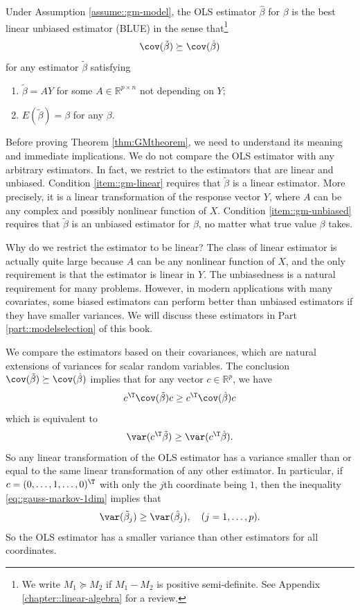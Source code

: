 \begin{theorem}
\label{thm:GMtheorem}Under Assumption \ref{assume::gm-model}, the OLS estimator
$\hat{\beta}$ for $\beta$ is the best linear unbiased estimator
(BLUE) in the sense that\footnote{We write $M_1 \succeq   M_2$  if $M_1 - M_2$ is positive semi-definite. See Appendix \ref{chapter::linear-algebra} for a review.} 
$$
\cov(\tilde{\beta})  \succeq 
\cov(\hat{\beta})
$$
for any estimator $\tilde{\beta}$ satisfying 
\begin{enumerate}[label=(\textup{C}\arabic*), ref=\textup{C}\arabic*]
\item\label{item::gm-linear} $\tilde{\beta}=AY$ for some $A\in\mathbb{R}^{p\times n}$ not depending
on $Y$;
\item\label{item::gm-unbiased} $ E (\tilde{\beta} ) = \beta$   for any
$\beta$.
\end{enumerate}
\end{theorem}

Before proving Theorem \ref{thm:GMtheorem}, we need to understand its meaning and immediate implications. We do not compare the OLS estimator with any arbitrary estimators. In fact, we restrict to the estimators that are linear and unbiased.  Condition \eqref{item::gm-linear} requires that  $\tilde{\beta}$ is a linear estimator. More precisely, it is a linear transformation of the
response vector $Y$, where $A$ can be any complex and possibly nonlinear function of $X$. Condition \eqref{item::gm-unbiased} requires that $\tilde{\beta}$  is an unbiased estimator for $\beta$, no matter what true value $\beta$ takes. 



Why do we restrict the estimator to be linear? The class of linear estimator is actually quite large because $A$ can be any nonlinear function of $X$, and the only requirement is that the estimator is linear in $Y$. The unbiasedness is a natural requirement for many problems. However, in modern applications with many covariates, some biased estimators can perform better than unbiased estimators if they have smaller variances. We will discuss these estimators in Part \ref{part::modelselection} of this book.  




We compare the estimators based on their covariances, which are natural extensions of variances for scalar random variables. The conclusion $\cov(\tilde{\beta}) \succeq  \cov(\hat{\beta})$ implies that for any vector $c  \in \mathbb{R}^p$, we have
$$
c ^{\T}\cov(\tilde{\beta}) c 
\geq 
c ^{\T}  \cov(\hat{\beta})  c  
$$
which is equivalent to
\begin{equation}\label{eq::gauss-markov-1dim}
\var(  c ^{\T} \tilde{\beta} ) \geq   \var(c ^{\T}  \hat{\beta}) . 
\end{equation}
So any linear transformation of the OLS estimator has a variance smaller than or equal to the same linear transformation of any other estimator. In particular, if $c  = (0,\ldots, 1,\ldots, 0)^{\T}$ with only the $j$th coordinate being $1$, then the inequality \eqref{eq::gauss-markov-1dim} implies that 
$$
\var(\tilde{\beta}_j) \geq 
\var(\hat{\beta}_j)   ,\quad (j=1,\ldots, p).
$$
So the OLS estimator has a smaller variance than other estimators for all coordinates. 


